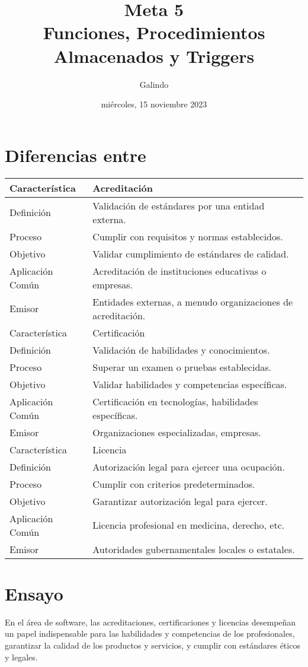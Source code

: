 \documentclass[11pt]{article}
\author{Galindo}
\date{miércoles, 15 noviembre 2023}
\title{Meta 5\\\medskip
\large Funciones, Procedimientos Almacenados y Triggers}
\begin{document}

\section{Diferencias entre}
\label{sec:org373a62d}
\begin{center}
\begin{tabular}{ll}
\hline
Característica & Acreditación\\
\hline
Definición & Validación de estándares por una entidad externa.\\
Proceso & Cumplir con requisitos y normas establecidos.\\
Objetivo & Validar cumplimiento de estándares de calidad.\\
Aplicación Común & Acreditación de instituciones educativas o empresas.\\
Emisor & Entidades externas, a menudo organizaciones de acreditación.\\
\hline
Característica & Certificación\\
\hline
Definición & Validación de habilidades y conocimientos.\\
Proceso & Superar un examen o pruebas establecidas.\\
Objetivo & Validar habilidades y competencias específicas.\\
Aplicación Común & Certificación en tecnologías, habilidades específicas.\\
Emisor & Organizaciones especializadas, empresas.\\
\hline
Característica & Licencia\\
\hline
Definición & Autorización legal para ejercer una ocupación.\\
Proceso & Cumplir con criterios predeterminados.\\
Objetivo & Garantizar autorización legal para ejercer.\\
Aplicación Común & Licencia profesional en medicina, derecho, etc.\\
Emisor & Autoridades gubernamentales locales o estatales.\\
\hline
\end{tabular}

\end{center}

\section{Ensayo}
\label{sec:org1049eab}
En el área de software, las acreditaciones, certificaciones y
licencias desempeñan un papel indispensable para las habilidades y
competencias de los profesionales, garantizar la calidad de los
productos y servicios, y cumplir con estándares éticos y legales.
\end{document}
